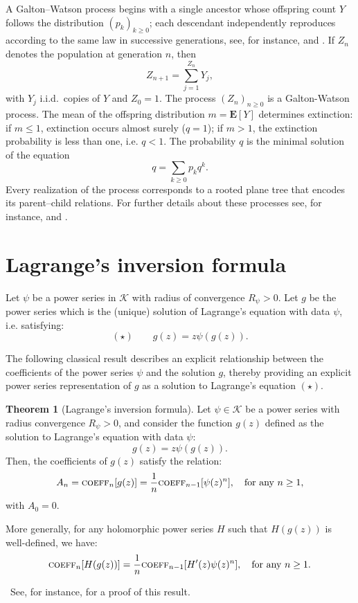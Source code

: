 \documentclass[11pt,a4paper,leqno]{amsart}
\theoremstyle{plain}
\theoremstyle{definition}
\numberwithin{equation}{section}
\newtheorem{thmletra}{Theorem}
\def\E{\mathbf{E}}
\def\K{\mathcal{K}}
\begin{document}
	A Galton–Watson process begins with a single ancestor whose offspring count \(Y\) follows the distribution \((p_k)_{k\ge0}\); each descendant independently reproduces according to the same law in successive generations, see, for instance,  \cite{AthreyaNey} and \cite{Neveu}. If \(Z_n\) denotes the population at generation \(n\), then
	\[
	Z_{n+1}=\sum_{j=1}^{Z_n}Y_j,
	\]
	with \(Y_j\) i.i.d.\ copies of \(Y\) and $Z_0 = 1$. The process $(Z_n)_{n \geq 0}$ is a Galton-Watson process. The mean of the offspring distribution \(m=\E[Y]\) determines extinction: if \(m\le1\), extinction occurs almost surely (\(q=1\)); if \(m>1\), the extinction probability is less than one, i.e. \(q<1\). The probability $q$ is the minimal solution of the equation
	\[
	q=\sum_{k\ge0}p_kq^k.
	\]
	Every realization of the process corresponds to a rooted plane tree that encodes its parent–child relations. For further details about these processes see, for instance, \cite{AthreyaNey} and \cite{Neveu}.

	
	\section{Lagrange's inversion formula}
	
	Let $\psi$ be a power series in $\K$ with radius of convergence $R_\psi > 0$. Let $g$ be the  power series which is the (unique) solution of Lagrange's equation with data $\psi$, i.e. satisfying:
	$$(\star) \quad \quad g(z)=z \psi(g(z)).$$
	
	The following classical result describes an explicit relationship between the coefficients of the power series \( \psi \) and the solution \( g \), thereby providing an explicit power series representation of \( g \) as a solution to Lagrange's equation \((\star)\).
	
	\begin{thmletra}[Lagrange's inversion formula]
		Let \( \psi \in \mathcal{K} \) be a power series with radius convergence $R_{\psi}>0$, and consider the function \( g(z) \) defined as the solution to Lagrange's equation with data \( \psi \):
		\[
		g(z) = z\psi(g(z)).
		\]
		Then, the coefficients of \( g(z) \) satisfy the relation:
		\[
		A_n = \textsc{coeff}_n[g(z)] = \frac{1}{n} \textsc{coeff}_{n-1}[\psi(z)^n], \quad \text{for any } n \geq 1,
		\]
		with \( A_0 = 0 \).
		\smallskip
		
		More generally, for any holomorphic power series \( H \) such that \( H(g(z)) \) is well-defined, we have:
		\[
		\textsc{coeff}_n[H(g(z))] = \frac{1}{n} \textsc{coeff}_{n-1}[H^{\prime}(z) \psi(z)^n], \quad \text{for any } n \geq 1.
		\]
	\end{thmletra}~See, for instance, \cite{Gessel2016} for a proof of this result. 
	\medskip
	
\end{document}
